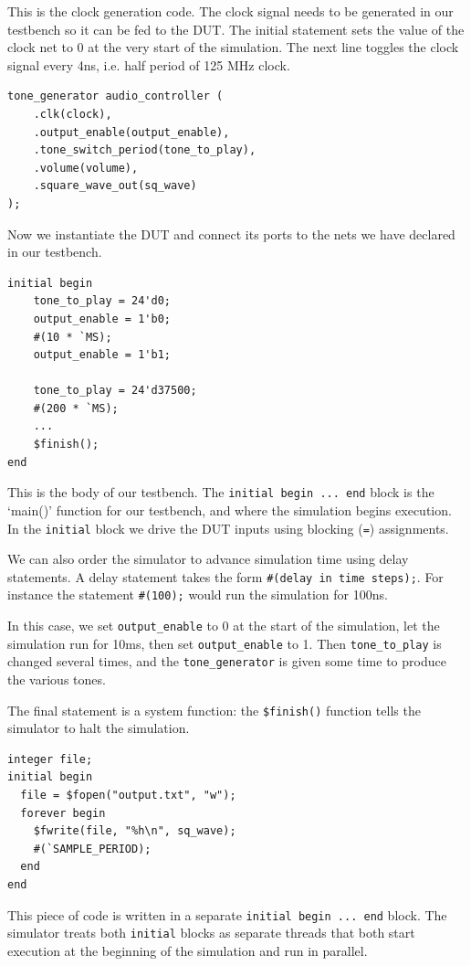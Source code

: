 \documentclass[11pt]{article}
\begin{document}
This is the clock generation code.
The clock signal needs to be generated in our testbench so it can be fed to the DUT.
The initial statement sets the value of the clock net to 0 at the very start of the simulation.
The next line toggles the clock signal every 4ns, i.e. half period of 125 MHz clock.

\begin{verbatim}
tone_generator audio_controller (
    .clk(clock),
    .output_enable(output_enable),
    .tone_switch_period(tone_to_play),
    .volume(volume),
    .square_wave_out(sq_wave)
);
\end{verbatim}

Now we instantiate the DUT and connect its ports to the nets we have declared in our testbench.

\begin{verbatim}
initial begin
    tone_to_play = 24'd0;
    output_enable = 1'b0;
    #(10 * `MS);
    output_enable = 1'b1;

    tone_to_play = 24'd37500;
    #(200 * `MS);
    ...
    $finish();
end
\end{verbatim}

This is the body of our testbench.
The \verb|initial begin ... end| block is the `main()' function for our testbench, and where the simulation begins execution.
In the \verb|initial| block we drive the DUT inputs using blocking (\verb|=|) assignments.

We can also order the simulator to advance simulation time using delay statements.
A delay statement takes the form \verb|#(delay in time steps);|.
For instance the statement \verb|#(100);| would run the simulation for 100ns.

In this case, we set \verb|output_enable| to 0 at the start of the simulation, let the simulation run for 10ms, then set \verb|output_enable| to 1.
Then \verb|tone_to_play| is changed several times, and the \verb|tone_generator| is given some time to produce the various tones.

The final statement is a system function: the \verb|$finish()| function tells the simulator to halt the simulation.

\begin{verbatim}
integer file;
initial begin
  file = $fopen("output.txt", "w");
  forever begin
    $fwrite(file, "%h\n", sq_wave);
    #(`SAMPLE_PERIOD);
  end
end
\end{verbatim}

This piece of code is written in a separate \verb|initial begin ... end| block.
The simulator treats both \verb|initial| blocks as separate threads that both start execution at the beginning of the simulation and run in parallel.
\end{document}
